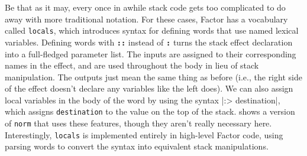 
Be that as it may, every once in awhile stack code gets too complicated to do
away with more traditional notation.  For these cases, Factor has a vocabulary
called \Verb|locals|, which introduces syntax for defining words that use named
lexical variables.  Defining words with \texttt{\textbf{::}} instead of
\texttt{\textbf{:}} turns the stack effect declaration into a full-fledged
parameter list.  The inputs are assigned to their corresponding names in the
effect, and are used throughout the body in lieu of stack manipulation.  The
outputs just mean the same thing as before (i.e., the right side of the effect
doesn't declare any variables like the left does).  We can also assign local
variables in the body of the word by using the syntax
%
\factor|:> destination|,
%
which assigns \Verb|destination| to the value on the top of the stack.
 shows a version of \Verb|norm| that uses these features,
though they aren't really necessary here.  Interestingly, \Verb|locals| is
implemented entirely in high-level Factor code, using parsing words to convert
the syntax into equivalent stack manipulations.
